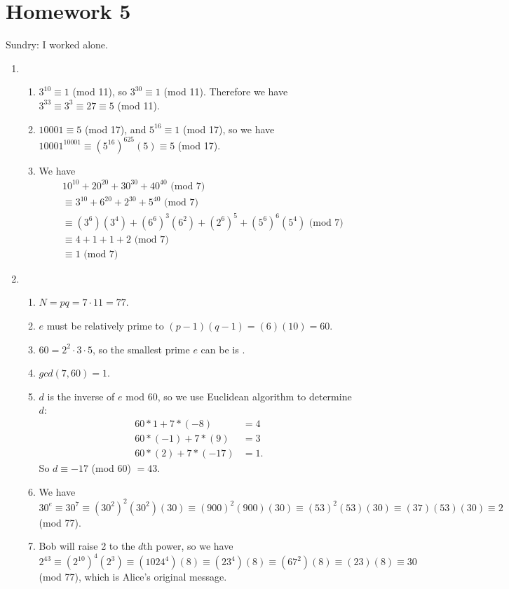 \section{Homework 5}
Sundry: I worked alone.

\begin{enumerate}
    \item \begin{enumerate}
        \item $3^{10}\equiv 1$ (mod 11), so $3^{30}\equiv 1$ (mod 11). Therefore we have $3^{33}\equiv 3^3\equiv 27 \equiv\boxed{5}$ (mod 11).
        \item $10001\equiv 5$ (mod 17), and $5^{16}\equiv 1$ (mod 17), so we have $10001^{10001}\equiv (5^{16})^{625}(5)\equiv\boxed{5}$ (mod 17).
        \item We have
        \begin{align*}
            &10^{10}+20^{20}+30^{30}+40^{40} \text{ (mod 7)} \\
            &\equiv 3^{10}+6^{20}+2^{30}+5^{40} \text{ (mod 7)} \\
            &\equiv (3^6)(3^4)+(6^6)^3(6^2)+(2^6)^5+(5^6)^6(5^4) \text{ (mod 7)} \\
            &\equiv 4+1+1+2 \text{ (mod 7)} \\
            &\equiv \boxed{1} \text{ (mod 7)}
        \end{align*}
    \end{enumerate}
    
    \item \begin{enumerate}
        \item $N=pq=7\cdot 11 = \boxed{77}$.
        \item $e$ must be relatively prime to $(p-1)(q-1)=(6)(10)=\boxed{60}$.
        \item $60=2^2\cdot 3\cdot 5$, so the smallest prime $e$ can be is .
        \item $gcd(7,60)=\boxed{1}$.
        \item $d$ is the inverse of $e$ mod 60, so we use Euclidean algorithm to determine $d$:
        \begin{align*}
            60*1 + 7*(-8) &= 4 \\
            60*(-1) + 7*(9) &= 3 \\
            60*(2) + 7*(-17) &= 1.
        \end{align*}
        So $d\equiv -17$ (mod 60) $=\boxed{43}$.
        \item We have $30^e\equiv 30^7\equiv (30^2)^2(30^2)(30)\equiv (900)^2(900)(30)\equiv (53)^2(53)(30)\equiv (37)(53)(30)\equiv \boxed{2}$ (mod 77).
        \item Bob will raise 2 to the $d$th power, so we have $2^{43}\equiv (2^10)^4(2^3)\equiv (1024^4)(8)\equiv (23^4)(8)\equiv (67^2)(8)\equiv (23)(8)\equiv \boxed{30}$ (mod 77), which is Alice's original message.
    \end{enumerate}
    

\end{enumerate}
